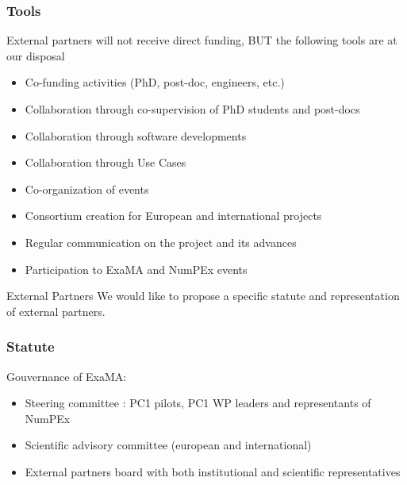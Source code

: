 \begin{frame}
  \frametitle{Tools}

  External partners will not receive direct funding, BUT the following tools are at our disposal

\begin{itemize}
  \item Co-funding activities (PhD, post-doc, engineers, etc.)
  \item Collaboration through co-supervision of PhD students and post-docs
  \item Collaboration through software developments
  \item Collaboration through Use Cases
  \item Co-organization of events
  \item Consortium creation for European and international projects
  \item Regular communication on the project and its advances
  \item Participation to ExaMA and NumPEx events
\end{itemize}

\begin{alertblock}{External Partners}
 We would like to propose a specific statute and representation of external partners.
\end{alertblock}
  
\end{frame}


\begin{frame}
  \frametitle{Statute}
  
  Gouvernance of ExaMA:
  \begin{itemize}
    \item Steering committee : PC1 pilots, PC1 WP leaders and representants of NumPEx 
    \item Scientific advisory committee (european and international)
    \item \alert{External partners board with both institutional and scientific representatives}
  \end{itemize}

\end{frame}
